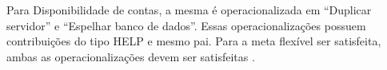 Para Disponibilidade de contas, a mesma é operacionalizada em “Duplicar servidor” e “Espelhar banco de dados”. Essas operacionalizações possuem contribuições do tipo HELP e mesmo pai. Para a meta flexível ser satisfeita, ambas as operacionalizações devem ser satisfeitas \cite{affleck2012supporting}. 

